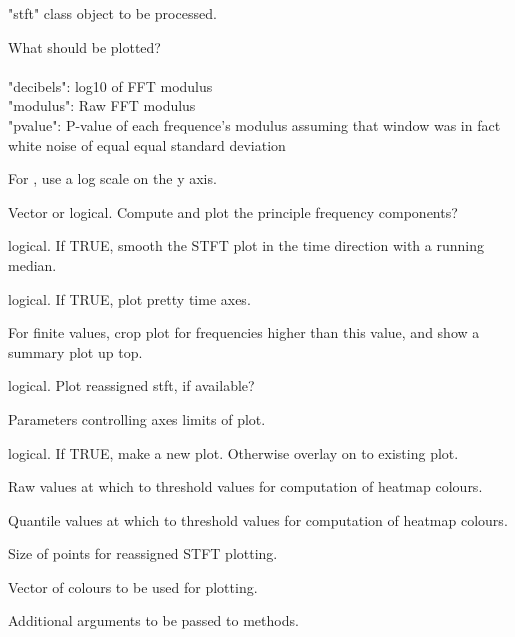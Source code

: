 \documentclass[a4paper]{book}
\begin{document}
%
\begin{Arguments}
\begin{ldescription}
\item[\code{x}] "stft" class object to be processed.
\item[\code{mode}] What should be plotted?\\{}\\{}
"decibels": log10 of FFT modulus\\{}
"modulus": Raw FFT modulus\\{}
"pvalue": P-value of each frequence's modulus assuming that window was in fact white noise of equal equal standard deviation
\item[\code{log}] For , use a log scale on the y axis.
\item[\code{showmax}] Vector or logical. Compute and plot the principle frequency components?
\item[\code{median}] logical. If TRUE, smooth the STFT plot in the time direction with a running median.
\item[\code{xaxis}] logical. If TRUE, plot pretty time axes.
\item[\code{topthresh}] For finite values, crop plot for frequencies higher than this value, and show a summary plot up top.
\item[\code{reassign}] logical. Plot reassigned stft, if available?
\item[\code{xlim, ylim}] Parameters controlling axes limits of plot.
\item[\code{new}] logical. If TRUE, make a new plot. Otherwise overlay on to existing plot.
\item[\code{zlim.raw}] Raw values at which to threshold values for computation of heatmap colours.
\item[\code{zlim.quantile}] Quantile values at which to threshold values for computation of heatmap colours.
\item[\code{cex}] Size of points for reassigned STFT plotting.
\item[\code{col}] Vector of colours to be used for plotting.
\item[\code{...}] Additional arguments to be passed to methods.
\end{ldescription}
\end{Arguments}
%
\end{document}

